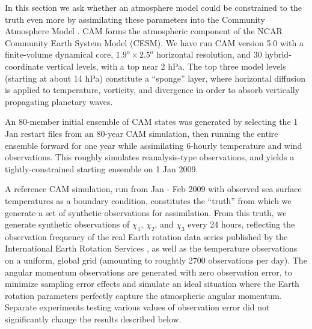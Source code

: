 In this section we ask whether an atmosphere model could be constrained to the truth even more by assimilating these parameters 
into the Community Atmosphere Model \citep[CAM][]{nealeetal2010}.
CAM forms the atmospheric component of the NCAR Community Earth System Model (CESM). 
We have run CAM version 5.0 with a finite-volume dynamical core, $1.9^{\text{o}} \times 2.5^{\text{o}}$ horizontal resolution, and  30 hybrid-coordinate vertical levels, with a top near 2 hPa.
The top three model levels (starting at about 14 hPa) constitute a ``sponge'' layer, where horizontal diffusion is applied to temperature, vorticity, and divergence in order to absorb vertically propagating planetary waves.  

An 80-member initial ensemble of CAM states was generated by selecting the 1 Jan restart files from an 80-year CAM simulation,
then running the entire ensemble forward for one year while 
assimilating 6-hourly temperature and wind observations. 
This roughly simulates reanalysis-type observations, and yields a tightly-constrained starting ensemble on 1 Jan 2009.  

A reference CAM simulation, run from Jan - Feb 2009 with observed sea surface temperatures as a boundary condition, constitutes the ``truth'' from which we generate a set of synthetic observations for assimilation. 
From this truth, we generate synthetic observations of $\chi_1$, $\chi_2$, and $\chi_3$ every 24 hours, reflecting the observation frequency of the real Earth rotation data series published by the International Earth Rotation Services \citep{iers}, as well as the temperature observations on a uniform, global grid (amounting to roughtly 2700 observations per day). 
The angular momentum observations are generated with zero observation error, to minimize sampling error effects and simulate an ideal situation where the Earth rotation parameters perfectly capture the atmospheric angular momentum. 
Separate experiments testing various values of observation error did not significantly change the results described below.  

